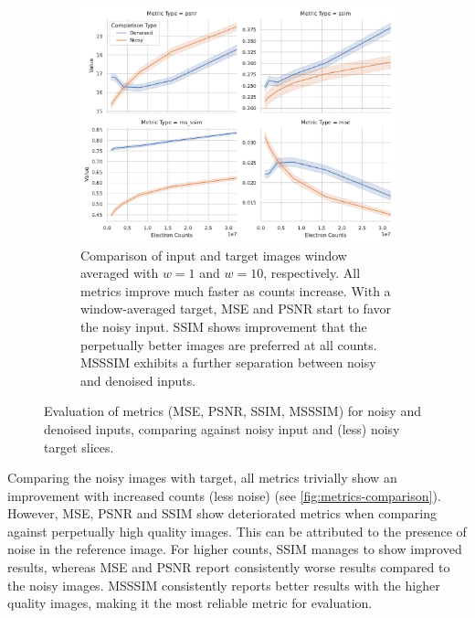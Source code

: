 \begin{figure}
\begin{subfigure}[t]{0.48\textwidth}
        \includegraphics[width=\textwidth]{images/metrics_comparison_denoised_noisy_averaged.pdf}
        \caption{Comparison of input and target images window averaged with $w=1$ and $w=10$, respectively. All metrics improve much faster as counts increase. With a window-averaged target, \gls{MSE} and \gls{PSNR} start to favor the noisy input. \gls{SSIM} shows improvement that the perpetually better images are preferred at all counts. \gls{MSSSIM} exhibits a further separation between noisy and denoised inputs.}
        \label{fig:metrics-comparison-averaged-target}
    \end{subfigure}
    \caption{Evaluation of metrics (\gls{MSE}, \gls{PSNR}, \gls{SSIM}, \gls{MSSSIM}) for noisy and denoised inputs, comparing against noisy input and (less) noisy target slices.}
    \label{fig:combined-metrics-comparison}
\end{figure}


Comparing the noisy images with target, all metrics trivially show an improvement with increased counts (less noise) (see \cref{fig:metrics-comparison}). However, \gls{MSE}, \gls{PSNR} and \gls{SSIM} show deteriorated metrics when comparing against perpetually high quality images. This can be attributed to the presence of noise in the reference image. For higher counts, \gls{SSIM} manages to show improved results, whereas \gls{MSE} and \gls{PSNR} report consistently worse results compared to the noisy images. \gls{MSSSIM} consistently reports better results with the higher quality images, making it the most reliable metric for evaluation.

